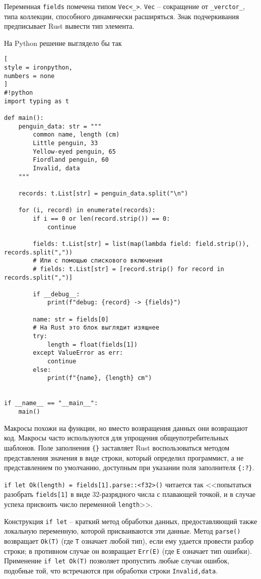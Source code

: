 \documentclass[%
	11pt,
	a4paper,
	utf8,
		]{article}
\begin{document}
Переменная \texttt{fields} помечена типом \verb|Vec<_>|. \verb|Vec| -- сокращение от \verb|_verctor_|, типа коллекции, способного динамически расширяться. Знак подчеркивания предписывает Rust вывести тип элемента.

На Python решение выглядело бы так
\begin{lstlisting}[
style = ironpython,
numbers = none
]
#!python
import typing as t

def main():
    penguin_data: str = """
        common name, length (cm)
        Little penguin, 33
        Yellow-eyed penguin, 65
        Fiordland penguin, 60
        Invalid, data
    """
    
    records: t.List[str] = penguin_data.split("\n")
    
    for (i, record) in enumerate(records):
        if i == 0 or len(record.strip()) == 0:
            continue
            
        fields: t.List[str] = list(map(lambda field: field.strip()), records.split(","))
        # Или с помощью спискового включения
        # fields: t.List[str] = [record.strip() for record in records.split(",")]
        
        if __debug__:
            print(f"debug: {record} -> {fields}")
            
        name: str = fields[0]
        # На Rust это блок выглядит изящнее
        try:
            length = float(fields[1])
        except ValueError as err:
            continue
        else:
            print(f"{name}, {length} cm")
            

if __name__ == "__main__":
    main()
\end{lstlisting}

Макросы похожи на функции, но вместо возвращения данных они возвращают код. Макросы часто используются для упрощения общеупотребительных шаблонов. Поле заполнения \verb|{}| заставляет Rust воспользоваться методом представления значения в виде строки, который определил программист, а не представлением по умолчанию, доступным при указании поля заполнителя \verb|{:?}|.

\verb|if let Ok(length) = fields[1].parse::<f32>()| читается так <<попытаться разобрать \texttt{fields[1]} в виде 32-разрядного числа с плавающей точкой, и в случае успеха присвоить число переменной \verb|length|>>.

Конструкция \verb|if let| -- краткий метод обработки данных, предоставляющий также локальную переменную, которой присваиваются эти данные. Метод \verb|parse()| возвращает \texttt{Ok(T)} (где \verb|T| означает любой тип), если ему удается провести разбор строки; в противном случае он возвращает \texttt{Err(E)} (где \texttt{E} означает тип ошибки). Применение \verb|if let Ok(T)| позволяет пропустить любые случаи ошибок, подобные той, что встречаются при обработки строки \texttt{Invalid,data}.
\end{document}
